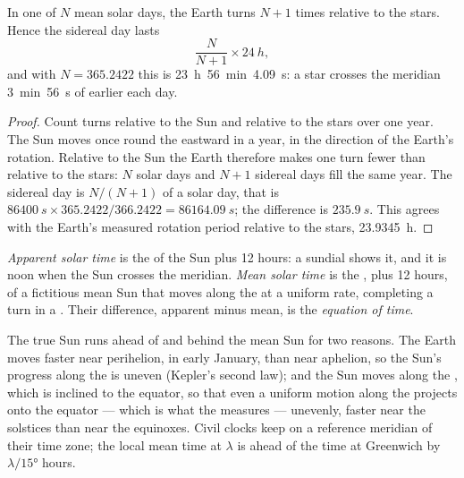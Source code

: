 \begin{proposition}\label{prop:b1:spherical-astronomy:sidereal-day}
In one  of $N$ mean solar days, the Earth turns $N + 1$ times
relative to the stars. Hence the sidereal day lasts
\[
  \frac{N}{N + 1}\times\qty{24}{h},
\]
and with $N = 365.2422$ this is \qty{23}{h}~\qty{56}{min}~\qty{4.09}{s}: a
star crosses the meridian \qty{3}{min}~\qty{56}{s} of  earlier
each day.
\end{proposition}

\begin{proof}
Count turns relative to the Sun and relative to the stars over one year. The
Sun moves once round the  eastward in a year, in the direction of the
Earth's rotation. Relative to the Sun the Earth therefore makes one turn
fewer than relative to the stars: $N$ solar days and $N + 1$ sidereal days
fill the same year. The sidereal day is $N/(N+1)$ of a solar day, that is
$\qty{86400}{s}\times 365.2422/366.2422 = \qty{86164.09}{s}$; the difference
is $\qty{235.9}{s}$. This agrees with the Earth's measured rotation period
relative to the stars, \qty{23.9345}{h}.
\end{proof}

\begin{definition}\label{def:b1:spherical-astronomy:solar-time}
\emph{Apparent solar time} is the  of
the Sun plus 12 hours: a sundial shows it, and it is noon when the Sun
crosses the meridian. \emph{Mean solar time} is the
, plus 12 hours, of a fictitious mean Sun that moves along the
 at a uniform rate, completing a turn in a .
Their difference, apparent minus mean, is the \emph{equation of
time}.
\end{definition}

The true Sun runs ahead of and behind the mean Sun for two reasons. The
Earth moves faster near perihelion, in early January, than near aphelion, so
the Sun's progress along the  is uneven (Kepler's second law); and
the Sun moves along the , which is inclined to the equator, so that
even a uniform motion along the  projects onto the equator --- which is
what the  measures --- unevenly, faster near the solstices than near
the equinoxes. Civil clocks keep  on a reference meridian of
their time zone; the local mean time at  $\lambda$ is ahead of the
time at Greenwich by $\lambda/\ang{15}$ hours.


